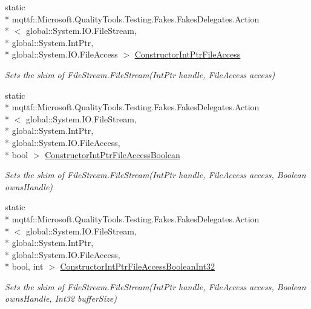 \begin{DoxyCompactItemize}
static \\*
mqttf\-::\-Microsoft.\-Quality\-Tools.\-Testing.\-Fakes.\-Fakes\-Delegates.\-Action\\*
$<$ global\-::\-System.\-I\-O.\-File\-Stream, \\*
global\-::\-System.\-Int\-Ptr, \\*
global\-::\-System.\-I\-O.\-File\-Access $>$ \hyperlink{class_system_1_1_i_o_1_1_fakes_1_1_shim_file_stream_a09678c8fbe0f17f679755e2579409475}{Constructor\-Int\-Ptr\-File\-Access}
\begin{DoxyCompactList}\small\item\em Sets the shim of File\-Stream.\-File\-Stream(\-Int\-Ptr handle, File\-Access access)\end{DoxyCompactList}\item 
static \\*
mqttf\-::\-Microsoft.\-Quality\-Tools.\-Testing.\-Fakes.\-Fakes\-Delegates.\-Action\\*
$<$ global\-::\-System.\-I\-O.\-File\-Stream, \\*
global\-::\-System.\-Int\-Ptr, \\*
global\-::\-System.\-I\-O.\-File\-Access, \\*
bool $>$ \hyperlink{class_system_1_1_i_o_1_1_fakes_1_1_shim_file_stream_a034e423bb6387e5f32269518c2111889}{Constructor\-Int\-Ptr\-File\-Access\-Boolean}
\begin{DoxyCompactList}\small\item\em Sets the shim of File\-Stream.\-File\-Stream(\-Int\-Ptr handle, File\-Access access, Boolean owns\-Handle)\end{DoxyCompactList}\item 
static \\*
mqttf\-::\-Microsoft.\-Quality\-Tools.\-Testing.\-Fakes.\-Fakes\-Delegates.\-Action\\*
$<$ global\-::\-System.\-I\-O.\-File\-Stream, \\*
global\-::\-System.\-Int\-Ptr, \\*
global\-::\-System.\-I\-O.\-File\-Access, \\*
bool, int $>$ \hyperlink{class_system_1_1_i_o_1_1_fakes_1_1_shim_file_stream_ac31f588420a8b9ddb6ba1ae1f75140aa}{Constructor\-Int\-Ptr\-File\-Access\-Boolean\-Int32}
\begin{DoxyCompactList}\small\item\em Sets the shim of File\-Stream.\-File\-Stream(\-Int\-Ptr handle, File\-Access access, Boolean owns\-Handle, Int32 buffer\-Size)\end{DoxyCompactList}\item 

\end{DoxyCompactItemize}
